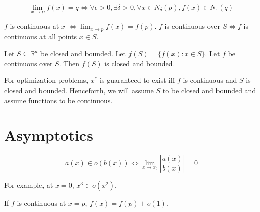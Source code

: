 \begin{definition}
\[ \lim_{x\rightarrow p} f(x) = q \iff \forall \epsilon > 0, \exists \delta > 0,
\forall x \in N_{\delta}(p), f(x) \in N_{\epsilon}(q) \]
\end{definition}

\begin{definition}
$f$ is continuous at $x$ $\iff \lim_{x\rightarrow p} f(x) = f(p)$.
$f$ is continuous over $S \iff f$ is continuous at all points $x \in S$.
\end{definition}

\begin{theorem}
Let $S \subseteq \mathbb{R}^d$ be closed and bounded.
Let $f(S) = \{f(x): x \in S\}$.
Let $f$ be continuous over $S$.
Then $f(S)$ is closed and bounded.
\end{theorem}

For optimization problems, $x^*$ is guaranteed to exist iff
$f$ is continuous and $S$ is closed and bounded.
Henceforth, we will assume $S$ to be closed and bounded
and assume functions to be continuous.

\section{Asymptotics}

\[ a(x) \in o(b(x)) \iff \lim_{x \rightarrow x_0} \left| \frac{a(x)}{b(x)} \right| = 0\]

For example, at $x=0$, $x^3 \in o(x^2)$.

If $f$ is continuous at $x=p$, $f(x) = f(p) + o(1)$.


